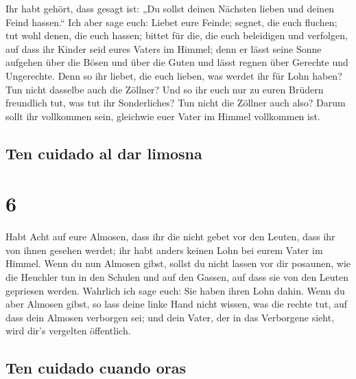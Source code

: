  Ihr habt gehört, dass gesagt ist: „Du sollst deinen
Nächsten lieben und deinen Feind hassen.``  Ich aber sage
euch: Liebet eure Feinde; segnet, die euch fluchen; tut wohl denen, die
euch hassen; bittet für die, die euch beleidigen und verfolgen,
 auf dass ihr Kinder seid eures Vaters im Himmel; denn er
lässt seine Sonne aufgehen über die Bösen und über die Guten und lässt
regnen über Gerechte und Ungerechte.  Denn so ihr liebet,
die euch lieben, was werdet ihr für Lohn haben? Tun nicht dasselbe auch
die Zöllner?  Und so ihr euch nur zu euren Brüdern
freundlich tut, was tut ihr Sonderliches? Tun nicht die Zöllner auch
also?  Darum sollt ihr vollkommen sein, gleichwie euer
Vater im Himmel vollkommen ist.

\hypertarget{ten-cuidado-al-dar-limosna}{%
\subsection{Ten cuidado al dar
limosna}\label{ten-cuidado-al-dar-limosna}}

\hypertarget{section-5}{%
\section{6}\label{section-5}}

 Habt Acht auf eure Almosen, dass ihr die nicht gebet vor
den Leuten, dass ihr von ihnen gesehen werdet; ihr habt anders keinen
Lohn bei eurem Vater im Himmel.  Wenn du nun Almosen
gibst, sollst du nicht lassen vor dir posaunen, wie die Heuchler tun in
den Schulen und auf den Gassen, auf dass sie von den Leuten gepriesen
werden. Wahrlich ich sage euch: Sie haben ihren Lohn dahin.
 Wenn du aber Almosen gibst, so lass deine linke Hand
nicht wissen, was die rechte tut,  auf dass dein Almosen
verborgen sei; und dein Vater, der in das Verborgene sieht, wird dir's
vergelten öffentlich.

\hypertarget{ten-cuidado-cuando-oras}{%
\subsection{Ten cuidado cuando oras}\label{ten-cuidado-cuando-oras}}

